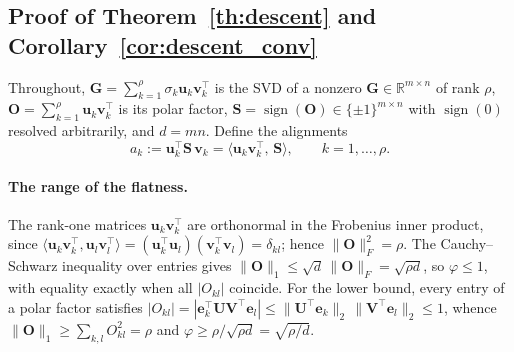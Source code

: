 \documentclass{article}
\begin{document}
\newpage
\subsection{Proof of Theorem~\ref{th:descent} and Corollary~\ref{cor:descent_conv}}\label{app:proof_th_descent}

Throughout, $\mathbf{G}=\sum_{k=1}^{\rho}\sigma_k\mathbf{u}_k\mathbf{v}_k^\top$ is the SVD of a nonzero $\mathbf{G}\in\mathbb{R}^{m\times n}$ of rank $\rho$, $\mathbf{O}=\sum_{k=1}^{\rho}\mathbf{u}_k\mathbf{v}_k^\top$ is its polar factor, $\mathbf{S}=\operatorname{sign}(\mathbf{O})\in\{\pm1\}^{m\times n}$ with $\operatorname{sign}(0)$ resolved arbitrarily, and $d=mn$. Define the alignments
\begin{equation}
a_k := \mathbf{u}_k^\top\mathbf{S}\,\mathbf{v}_k = \langle \mathbf{u}_k\mathbf{v}_k^\top,\, \mathbf{S}\rangle, \qquad k = 1,\dots,\rho .
\end{equation}

\paragraph{The range of the flatness.} The rank-one matrices $\mathbf{u}_k\mathbf{v}_k^\top$ are orthonormal in the Frobenius inner product, since $\langle \mathbf{u}_k\mathbf{v}_k^\top, \mathbf{u}_l\mathbf{v}_l^\top\rangle = (\mathbf{u}_k^\top\mathbf{u}_l)(\mathbf{v}_k^\top\mathbf{v}_l) = \delta_{kl}$; hence $\|\mathbf{O}\|_F^2 = \rho$. The Cauchy--Schwarz inequality over entries gives $\|\mathbf{O}\|_1 \le \sqrt{d}\,\|\mathbf{O}\|_F = \sqrt{\rho d}$, so $\varphi \le 1$, with equality exactly when all $|O_{kl}|$ coincide. For the lower bound, every entry of a polar factor satisfies $|O_{kl}| = |\mathbf{e}_k^\top \mathbf{U}\mathbf{V}^\top \mathbf{e}_l| \le \|\mathbf{U}^\top\mathbf{e}_k\|_2\,\|\mathbf{V}^\top\mathbf{e}_l\|_2 \le 1$, whence $\|\mathbf{O}\|_1 \ge \sum_{k,l} O_{kl}^2 = \rho$ and $\varphi \ge \rho/\sqrt{\rho d} = \sqrt{\rho/d}$.
\end{document}
